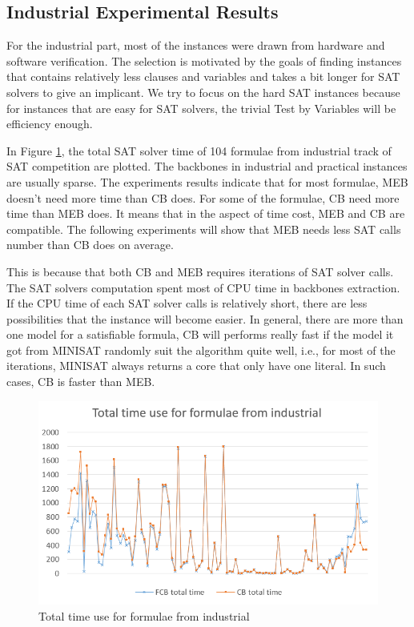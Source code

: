\subsection{Industrial Experimental Results}

For the industrial part, most of the instances were drawn from hardware and software verification. The selection is motivated by the goals of finding instances that contains relatively less clauses and variables and takes a bit longer for SAT solvers to give an implicant. We try to focus on the hard SAT instances because for instances that are easy for SAT solvers, the trivial Test by Variables will be efficiency enough.

In Figure \ref{fig:ind-time}, the total SAT solver time of 104 formulae from industrial track of SAT competition are plotted. The backbones in industrial and practical instances are usually sparse. The experiments results indicate that for most formulae, MEB doesn't need more time than CB does. For some of the formulae, CB need more time than MEB does. It means that in the aspect of time cost, MEB and CB are compatible. The following experiments will show that MEB needs less SAT calls number than CB does on average.

This is because that both CB and MEB requires iterations of SAT solver calls. The SAT solvers computation spent most of CPU time in backbones extraction. If the CPU time of each SAT solver calls is relatively short, there are less possibilities that the instance will become easier. In general, there are more than one model for a satisfiable formula, CB will performs really fast if the model it got from MINISAT randomly suit the algorithm quite well, i.e., for most of the iterations, MINISAT always returns a core that only have one literal. In such cases, CB is faster than MEB.

\begin{figure}
    \centering
    \includegraphics[scale=0.3]{ind-time.png}
   \caption{Total time use for formulae from industrial}
   \label{fig:ind-time}
\end{figure}

